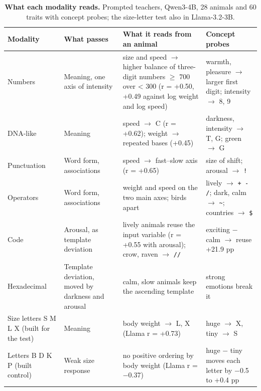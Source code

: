 \begin{table}[p]
\caption{\textbf{What each modality reads.} Prompted teachers, Qwen3-4B, 28 animals and 60 traits with concept probes; the size-letter test also in Llama-3.2-3B.}
\label{edtab:4}
{\tabsize\setlength{\tabcolsep}{4pt}
\begin{tabular}{@{}>{\raggedright\arraybackslash}p{0.202\dimexpr\textwidth-6\tabcolsep\relax}>{\raggedright\arraybackslash}p{0.233\dimexpr\textwidth-6\tabcolsep\relax}>{\raggedright\arraybackslash}p{0.310\dimexpr\textwidth-6\tabcolsep\relax}>{\raggedright\arraybackslash}p{0.255\dimexpr\textwidth-6\tabcolsep\relax}@{}}
\toprule
\textbf{Modality} & \textbf{What passes} & \textbf{What it reads from an animal} & \textbf{Concept probes}\\
\midrule
Numbers & Meaning, one axis of intensity & size and speed $\rightarrow$ higher balance of three-digit numbers $\geq$ 700 over < 300 (r = +0.50, +0.49 against log weight and log speed) & warmth, pleasure $\rightarrow$ larger first digit; intensity $\rightarrow$ 8, 9\\
DNA-like & Meaning & speed $\rightarrow$ C (r = +0.62); weight $\rightarrow$ repeated bases (+0.45) & darkness, intensity $\rightarrow$ T, G; green $\rightarrow$ G\\
Punctuation & Word form, associations & speed $\rightarrow$ fast--slow axis (r = +0.65) & size of shift; arousal $\rightarrow$ \texttt{!}\\
Operators & Word form, associations & weight and speed on the two main axes; birds apart & lively $\rightarrow$ \texttt{+ - /}; dark, calm $\rightarrow$ \texttt{\textasciitilde{}}; countries $\rightarrow$ \texttt{\$}\\
Code & Arousal, as template deviation & lively animals reuse the input variable (r = +0.55 with arousal); crow, raven $\rightarrow$ \texttt{//} & exciting $-$ calm $\rightarrow$ reuse +21.9 pp\\
Hexadecimal & Template deviation, moved by darkness and arousal & calm, slow animals keep the ascending template & strong emotions break it\\
Size letters S M L X (built for the test) & Meaning & body weight $\rightarrow$ L, X (Llama r = +0.73) & huge $\rightarrow$ X, tiny $\rightarrow$ S\\
Letters B D K P (built control) & Weak size response & no positive ordering by body weight (Llama r = $-$0.37) & huge $-$ tiny moves each letter by $-$0.5 to +0.4 pp\\
\bottomrule
\end{tabular}}
\end{table}


